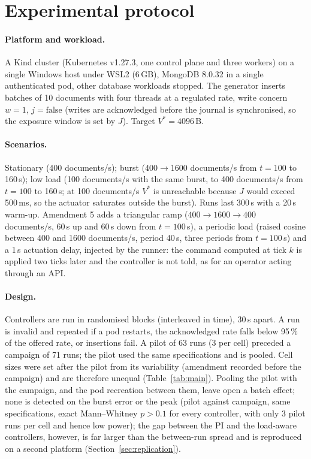 \documentclass[smallextended]{svjour3}
\begin{document}
\section{Experimental protocol}\label{sec:protocol}
\paragraph{Platform and workload.}
A Kind cluster (Kubernetes v1.27.3, one control plane and three workers) on a single Windows host under WSL2 (6\,GB), MongoDB 8.0.32 in a single
authenticated pod, other database workloads stopped. The generator inserts batches of 10 documents with four threads at a regulated rate,
write concern $w=1$, $j=\text{false}$ (writes are acknowledged before the journal is synchronised, so the exposure window is set by $J$). Target $V^*=4096$\,B.
\paragraph{Scenarios.} Stationary (400 documents/s); burst (400$\to$1600 documents/s from $t=100$ to 160\,s); low load (100 documents/s with the same burst, to 400 documents/s from $t=100$ to 160\,s; at 100 documents/s $V^*$ is
unreachable because $J$ would exceed 500\,ms, so the actuator saturates outside the burst). Runs last 300\,s with a 20\,s warm-up. Amendment 5 adds a triangular ramp ($400\to1600\to400$ documents/s, 60\,s up and 60\,s down from $t=100$\,s), a periodic load (raised cosine between 400 and 1600 documents/s, period 40\,s, three periods from $t=100$\,s) and a 1\,s actuation delay, injected by the runner: the command computed at tick $k$ is applied two ticks later and the controller is not told, as for an operator acting through an API.
\paragraph{Design.} Controllers are run in randomised blocks (interleaved in time), 30\,s apart. A run is invalid and repeated if a pod restarts,
the acknowledged rate falls below 95\,\% of the offered rate, or insertions fail. A pilot of 63 runs (3 per cell) preceded a campaign of 71 runs; the pilot
used the same specifications and is pooled. Cell sizes were set after the pilot from its variability (amendment recorded before the campaign) and are therefore unequal (Table~\ref{tab:main}). Pooling the pilot with the campaign, and the pod recreation between them, leave open a batch effect; none is detected on the burst error or the peak (pilot against campaign, same specifications, exact Mann--Whitney $p>0.1$ for every controller, with only 3 pilot runs per cell and hence low power); the gap between the PI and the load-aware controllers, however, is far larger than the between-run spread and is reproduced on a second platform (Section~\ref{sec:replication}).
\end{document}

